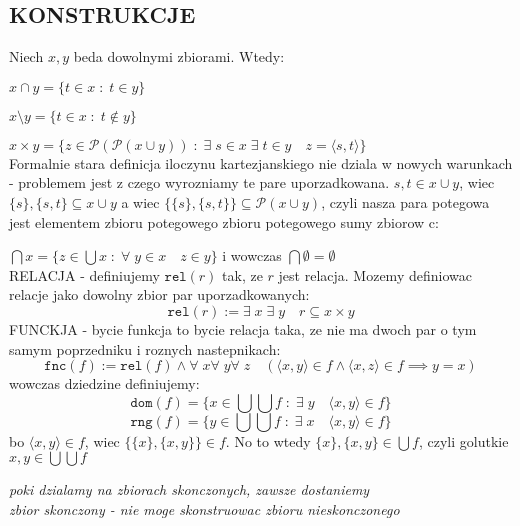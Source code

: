 \documentclass{article}
\newcommand{\Po}{\mathcal{P}}
\begin{document}
\subsection*{KONSTRUKCJE}
  Niech $x,y$ beda dowolnymi zbiorami. Wtedy:\smallskip\par
    $x\cap y=\{t\in x\;:\;t\in y\}$\smallskip\par
    $x\setminus y =\{t\in x\; : \;t\notin y\}$\smallskip\par
    $x\times y =\{z\in\Po(\Po(x\cup y))\;:\;\exists\;s\in x\;\exists\;t\in y\quad z=\langle s,t\rangle\}$\smallskip\\
    Formalnie stara definicja iloczynu kartezjanskiego nie dziala w nowych warunkach - problemem jest z czego wyrozniamy te pare uporzadkowana. $s,t\in x\cup y$, wiec $\{s\},\{s,t\}\subseteq x\cup y$  a wiec $\{\{s\},\{s,t\}\}\subseteq\Po(x\cup y)$, czyli nasza para potegowa jest elementem zbioru potegowego zbioru potegowego sumy zbiorow c:\smallskip\par
    $\bigcap x=\{z \in\bigcup x\;:\;\forall\;y\in x\quad z\in y\}$ i wowczas $\bigcap \emptyset=\emptyset$\bigskip\\
  \color{def}RELACJA \color{txt}- definiujemy $\texttt{rel}(r)$ tak, ze $r$ jest relacja. Mozemy definiowac relacje jako dowolny zbior par uporzadkowanych:
  $$\texttt{rel}(r):=\exists\;x\;\exists\;y\quad r\subseteq x\times y$$
  \color{def}FUNCKJA \color{txt}- bycie funkcja to bycie relacja taka, ze nie ma dwoch par o tym samym poprzedniku i roznych  nastepnikach:
  $$\texttt{fnc}(f):=\texttt{rel}(f)\land\forall\;x\forall\;y\forall\;z\quad(\langle x,y\rangle\in f\land \langle x,z\rangle\in f\implies y=x)$$
  wowczas dziedzine definiujemy:
  $$\texttt{dom}(f)=\{x\in\bigcup\bigcup f\;:\;\exists\;y\quad\langle x,y\rangle\in f\}$$
  $$\texttt{rng}(f)=\{y\in\bigcup\bigcup f\;:\;\exists\;x\quad\langle x,y\rangle\in f\}$$
  bo $\langle x,y\rangle\in f$, wiec $\{\{x\},\{x,y\}\}\in f$. No to wtedy $\{x\},\{x,y\}\in\bigcup f$, czyli golutkie $x,y\in\bigcup\bigcup f$\bigskip
  \begin{center}
    \color{acc}\emph{poki dzialamy na zbiorach skonczonych, zawsze dostaniemy \\zbior skonczony - nie moge skonstruowac zbioru nieskonczonego}
  \end{center}
\end{document}
